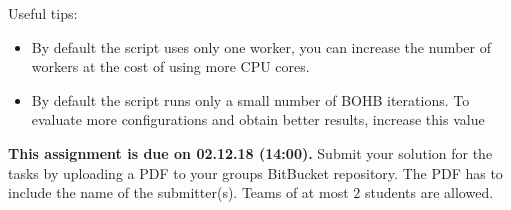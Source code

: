 \documentclass{exam}
\newcommand{\duedate}{02.12.18 (14:00)}
\newcommand{\due}{{\bf This assignment is due on \duedate.} }
\begin{document}
Useful tips:
\begin{itemize}
\item By default the script uses only one worker, you can increase the number of workers at the cost of using more CPU cores.
\item By default the script runs only a small number of BOHB iterations. To evaluate more configurations and obtain better results, increase this value
\end{itemize}

\noindent
\due Submit your solution for the tasks by uploading a PDF to your groups BitBucket repository. The PDF has to include the name of the submitter(s). Teams of at most $2$ students are allowed.
\end{document}
